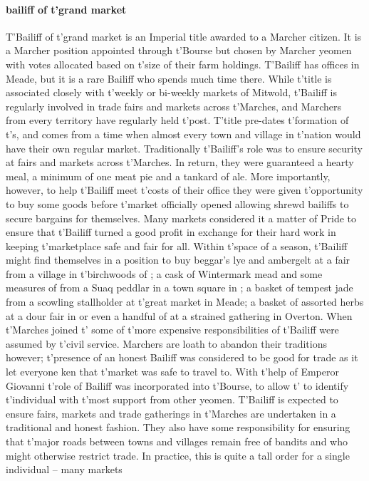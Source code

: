 \paragraph{bailiff of t'grand market} T'Bailiff of t'\allowbreak grand market is an Imperial title awarded to a Marcher citizen. It is a Marcher position appointed through t'\allowbreak Bourse but chosen by Marcher yeomen with votes allocated based on t'\allowbreak size of their farm holdings. T'Bailiff has offices in Meade, but it is a rare Bailiff who spends much time there. While t'\allowbreak title is associated closely with t'\allowbreak weekly or bi-weekly markets of Mitwold, t'\allowbreak Bailiff is regularly involved in trade fairs and markets across t'\allowbreak Marches, and Marchers from every territory have regularly held t'\allowbreak post. T'title pre-dates t'\allowbreak formation of t'\allowbreak {}s, and comes from a time when almost every town and village in t'\allowbreak nation would have their own regular market. Traditionally t'\allowbreak Bailiff's role was to ensure security at fairs and markets across t'\allowbreak Marches. In return, they were guaranteed a hearty meal, a minimum of one meat pie and a tankard of ale. More importantly, however, to help t'\allowbreak Bailiff meet t'\allowbreak costs of their office they were given t'\allowbreak opportunity to buy some goods before t'\allowbreak market officially opened allowing shrewd bailiffs to secure bargains for themselves. Many markets considered it a matter of Pride to ensure that t'\allowbreak Bailiff turned a good profit in exchange for their hard work in keeping t'\allowbreak marketplace safe and fair for all. Within t'\allowbreak space of a season, t'\allowbreak Bailiff might find themselves in a position to buy beggar's lye and ambergelt at a fair from a village in t'\allowbreak birchwoods of ; a cask of Wintermark mead and some measures of  from a Suaq peddlar in a town square in ; a basket of tempest jade from a scowling stallholder at t'\allowbreak great market in Meade; a basket of assorted herbs at a dour fair in  or even a handful of  at a strained gathering in Overton. When t'\allowbreak Marches joined t'\allowbreak {} some of t'\allowbreak more expensive responsibilities of t'\allowbreak Bailiff were assumed by t'\allowbreak civil service. Marchers are loath to abandon their traditions however; t'\allowbreak presence of an honest Bailiff was considered to be good for trade as it let everyone ken that t'\allowbreak market was safe to travel to. With t'\allowbreak help of Emperor Giovanni t'\allowbreak role of Bailiff was incorporated into t'\allowbreak Bourse, to allow t'\allowbreak {} to identify t'\allowbreak individual with t'\allowbreak most support from other yeomen. T'Bailiff is expected to ensure fairs, markets and trade gatherings in t'\allowbreak Marches are undertaken in a traditional and honest fashion. They also have some responsibility for ensuring that t'\allowbreak major roads between towns and villages remain free of bandits and  who might otherwise restrict trade. In practice, this is quite a tall order for a single individual – many markets 